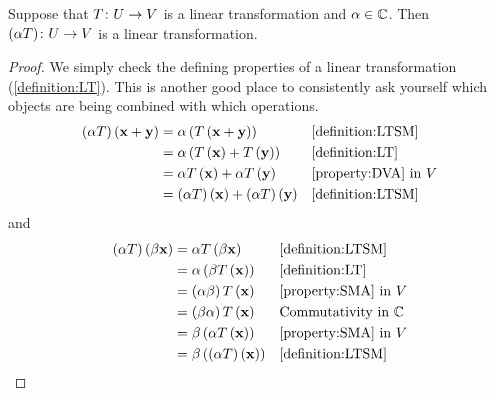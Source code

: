 \documentclass{ximera}
\begin{document}
\begin{theorem}
\label{theorem:MLTLT}

Suppose that $T\colon U\rightarrow V$ is a linear transformation and $\alpha\in\mathbb{C}$.  Then $(\alpha T)\colon U\rightarrow V$ is a linear transformation.


\begin{proof}
We simply check the defining properties of a linear transformation (\ref{definition:LT}).  This is another good place to consistently ask yourself which objects are being combined with which operations.
\begin{align*}
(\alpha T)\left(\mathbf{x}+\mathbf{y}\right)&=
\alpha\left(T\left(\mathbf{x}+\mathbf{y}\right)\right)&&\ref{definition:LTSM}\\
&=\alpha\left(T\left(\mathbf{x}\right)+T\left(\mathbf{y}\right)\right)&&\ref{definition:LT}\\
&=\alpha T\left(\mathbf{x}\right)+\alpha T\left(\mathbf{y}\right)&&\ref{property:DVA}\text{ in }V\\
&=(\alpha T)\left(\mathbf{x}\right)+(\alpha T)\left(\mathbf{y}\right)&&\ref{definition:LTSM}\\
\end{align*}
and
\begin{align*}
(\alpha T)\left(\beta\mathbf{x}\right)&=
\alpha T\left(\beta\mathbf{x}\right)&&\ref{definition:LTSM}\\
&=\alpha\left(\beta T\left(\mathbf{x}\right)\right)&&\ref{definition:LT}\\
&=\left(\alpha\beta\right)T\left(\mathbf{x}\right)&&\ref{property:SMA}\text{ in }V\\
&=\left(\beta\alpha\right)T\left(\mathbf{x}\right)&&\text{Commutativity in $\mathbb{C}^{}$}\\
&=\beta\left(\alpha T\left(\mathbf{x}\right)\right)&&\ref{property:SMA}\text{ in }V\\
&=\beta\left((\alpha T)\left(\mathbf{x}\right)\right)&&\ref{definition:LTSM}\\
\end{align*}




\end{proof}
\end{theorem}
\end{document}
